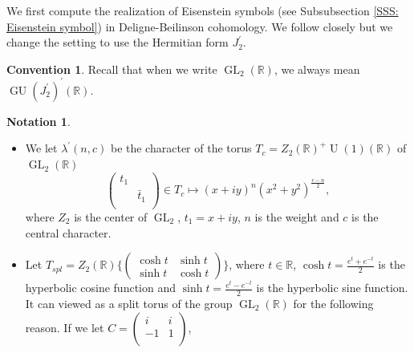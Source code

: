 \documentclass[11pt, a4paper]{amsart}
\theoremstyle{plain}
\theoremstyle{definition}
\newtheorem{convention}[theorem]{Convention}
\newtheorem{notation}[theorem]{Notation}
\numberwithin{equation}{section}
\def\RR{\mathbb{R}}
\DeclareMathOperator{\GU}{GU}
\DeclareMathOperator{\GL}{\mathrm{GL}}
\DeclareMathOperator{\U}{\mathrm{U}}
\begin{document}
We first compute the realization of Eisenstein symbols (see Subsubsection \ref{SSS: Eisenstein symbol}) in Deligne-Beilinson cohomology. We follow \cite[6.3]{Kings98} closely but we change the setting to use the Hermitian form $J_{2}^{\prime}$.  

\begin{convention}
    Recall that when we write $\GL_2(\RR)$, we always mean $\GU(J_{2}^{\prime})^{\prime}(\RR)$. 
\end{convention}

\begin{notation}
\label{Notation: character on GL2}
    \begin{itemize}
        \item We let $\lambda^{\prime}(n, c)$ be the character of the torus $T_{c} = Z_{2}(\RR)^{+}\U(1)(\RR)$ of $\GL_2(\RR)$
        \begin{equation*}
            \begin{pmatrix}
                t_1 & \\
                    & \bar{t}_{1} \\
            \end{pmatrix} \in  T_c   \longmapsto (x + iy)^{n}(x^2 + y^2)^{\frac{c - n}{2}}, 
        \end{equation*}
        where $Z_2$ is the center of $\GL_2$, $t_1 = x + iy$, $n$ is the weight and $c$ is the central character. 
        \item Let $T_{spl} = Z_{2}(\RR) \{ \begin{pmatrix}
                                                \cosh t & \sinh t \\
                                                \sinh t & \cosh t 
                                           \end{pmatrix} \}$,         where $t \in \RR$, $\cosh t = \frac{e^{t} + e^{-t}}{2}$ is the hyperbolic cosine function and $\sinh t = \frac{e^t - e^{-t}}{2}$ is the hyperbolic sine function. 
        It can viewed as a split torus of the group $\GL_2(\RR)$ for the following reason. 
        If we let $C = \begin{pmatrix}
                                                                                                                 i  & i \\
                                                                                                                 -1 & 1 \\
                                                                                                            \end{pmatrix}$, 

\end{itemize}
\end{notation}
\end{document}
